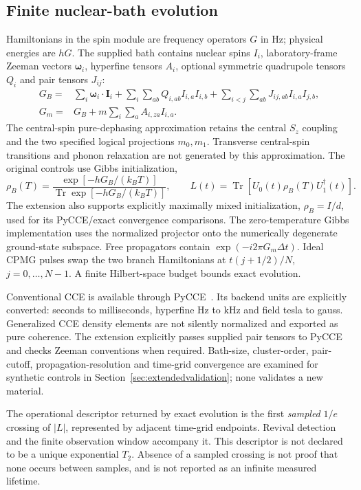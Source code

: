 \documentclass[11pt,a4paper]{article}
\newcommand{\Tr}{\operatorname{Tr}}
\begin{document}
\subsection{Finite nuclear-bath evolution}
Hamiltonians in the spin module are frequency operators $G$ in Hz; physical energies are $hG$. The supplied bath contains nuclear spins $I_i$, laboratory-frame Zeeman vectors $\boldsymbol\omega_i$, hyperfine tensors $A_i$, optional symmetric quadrupole tensors $Q_i$ and pair tensors $J_{ij}$:
\begin{align}
G_B={}&\sum_i\boldsymbol\omega_i\cdot\mathbf I_i+
\sum_i\sum_{ab}Q_{i,ab}I_{i,a}I_{i,b}+
\sum_{i<j}\sum_{ab}J_{ij,ab}I_{i,a}I_{j,b},\\
G_m={}&G_B+m\sum_i\sum_a A_{i,za}I_{i,a}.
\label{eq:bath}
\end{align}
The central-spin pure-dephasing approximation retains the central $S_z$ coupling and the two specified logical projections $m_0,m_1$. Transverse central-spin transitions and phonon relaxation are not generated by this approximation. The original controls use Gibbs initialization,
\begin{equation}
\rho_B(T)=\frac{\exp[-hG_B/(k_BT)]}{\Tr\exp[-hG_B/(k_BT)]},\qquad
L(t)=\Tr[U_0(t)\rho_B(T)U_1^\dagger(t)].
\label{eq:coherence}
\end{equation}
The extension also supports explicitly maximally mixed initialization, $\rho_B=I/d$, used for its PyCCE/exact convergence comparisons. The zero-temperature Gibbs implementation uses the normalized projector onto the numerically degenerate ground-state subspace. Free propagators contain $\exp(-i2\pi G_m\Delta t)$. Ideal CPMG pulses swap the two branch Hamiltonians at $t(j+1/2)/N$, $j=0,\ldots,N-1$. A finite Hilbert-space budget bounds exact evolution.

Conventional CCE is available through PyCCE~\cite{pycce}. Its backend units are explicitly converted: seconds to milliseconds, hyperfine Hz to kHz and field tesla to gauss. Generalized CCE density elements are not silently normalized and exported as pure coherence. The extension explicitly passes supplied pair tensors to PyCCE and checks Zeeman conventions when required. Bath-size, cluster-order, pair-cutoff, propagation-resolution and time-grid convergence are examined for synthetic controls in Section~\ref{sec:extendedvalidation}; none validates a new material.

The operational descriptor returned by exact evolution is the first \emph{sampled} $1/e$ crossing of $|L|$, represented by adjacent time-grid endpoints. Revival detection and the finite observation window accompany it. This descriptor is not declared to be a unique exponential $T_2$. Absence of a sampled crossing is not proof that none occurs between samples, and is not reported as an infinite measured lifetime.
\end{document}
